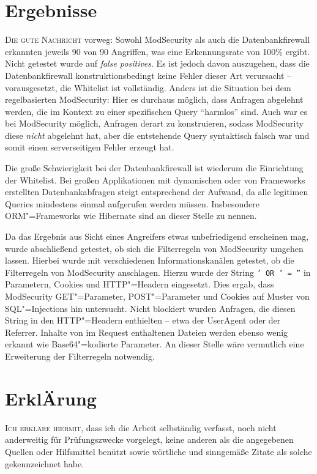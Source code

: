 \chapter{Ergebnisse}

\lettrine{D}{ie gute Nachricht} vorweg: Sowohl ModSecurity als auch die Datenbankfirewall erkannten jeweils 90 von 90 Angriffen, was eine Erkennungsrate von 100\% ergibt. Nicht getestet wurde auf \emph{false positives}. Es ist jedoch davon auszugehen, dass die Datenbankfirewall konstruktionsbedingt keine Fehler dieser Art verursacht -- vorausgesetzt, die Whitelist ist vollständig. Anders ist die Situation bei dem regelbasierten ModSecurity: Hier es durchaus möglich, dass Anfragen abgelehnt werden, die im Kontext zu einer spezifischen Query \enquote{harmlos} sind. Auch war es bei ModSecurity möglich, Anfragen derart zu konstruieren, sodass ModSecurity diese \emph{nicht} abgelehnt hat, aber die entstehende Query syntaktisch falsch war und somit einen serverseitigen Fehler erzeugt hat.

Die große Schwierigkeit bei der Datenbankfirewall ist wiederum die Einrichtung der Whitelist. Bei großen Applikationen mit dynamischen oder von Frameworks erstellten Datenbankabfragen steigt entsprechend der Aufwand, da alle legitimen Queries mindestens einmal aufgerufen werden müssen. Insbesondere ORM"=Frameworks wie Hibernate sind an dieser Stelle zu nennen.

Da das Ergebnis aus Sicht eines Angreifers etwas unbefriedigend erscheinen mag, wurde abschließend getestet, ob sich die Filterregeln von ModSecurity umgehen lassen. Hierbei wurde mit verschiedenen Informationskanälen getestet, ob die Filterregeln von ModSecurity anschlagen. Hierzu wurde der String \texttt{'\,OR\,'\,=\,''} in Parametern, Cookies und HTTP"=Headern eingesetzt. Dies ergab, dass ModSecurity GET"=Parameter, POST"=Parameter und Cookies auf Muster von SQL"=Injections hin untersucht. Nicht blockiert wurden Anfragen, die diesen String in den HTTP"=Headern enthielten -- etwa der UserAgent oder der Referrer. Inhalte von im Request enthaltenen Dateien werden ebenso wenig erkannt wie Base64"=kodierte Parameter. An dieser Stelle wäre vermutlich eine Erweiterung der Filterregeln notwendig.

\printbibliography


\chapter*{Erkl{\huge Ä}rung}
\lettrine{I}{ch erkläre hiermit,} dass ich die Arbeit selbständig verfasst, noch nicht anderweitig für Prüfungszwecke vorgelegt, keine anderen als die angegebenen Quellen oder Hilfsmittel benützt sowie wörtliche und sinngemäße Zitate als solche gekennzeichnet habe.

